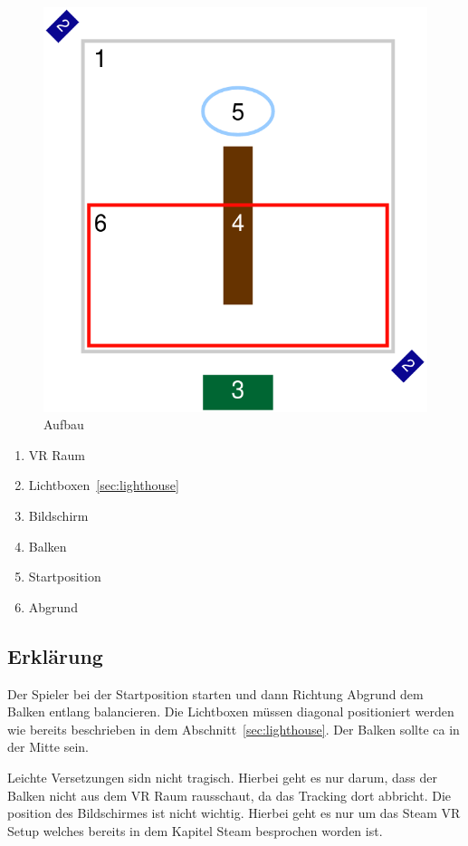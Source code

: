 \begin{figure}
    \includegraphics[scale=0.5]{pics/assemlbly}
    \caption{Aufbau}
    \label{fig:assembly}
\end{figure}

\begin{enumerate}
    \item VR Raum
    \item Lichtboxen~\ref{sec:lighthouse}
    \item Bildschirm
    \item Balken
    \item Startposition
    \item Abgrund
\end{enumerate}

\subsection{Erklärung}\label{subsec:description}

Der Spieler bei der Startposition starten und dann Richtung Abgrund dem Balken entlang balancieren.
Die Lichtboxen müssen diagonal positioniert werden wie bereits beschrieben in dem Abschnitt~\ref{sec:lighthouse}.
Der Balken sollte ca in der Mitte sein.

Leichte Versetzungen sidn nicht tragisch. Hierbei geht es nur darum, dass der Balken nicht aus dem VR Raum
rausschaut, da das Tracking dort abbricht. Die position des Bildschirmes ist nicht wichtig.
Hierbei geht es nur um das Steam VR Setup welches bereits in dem Kapitel Steam besprochen worden ist.

